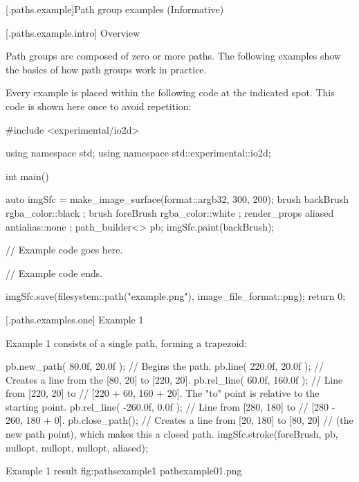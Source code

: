 

 [\iotwod.paths.example]{Path group examples (Informative)}

 [\iotwod.paths.example.intro] {Overview}

\pnum
Path groups are composed of zero or more paths. The following examples show the basics of how path groups work in practice.

\pnum
Every example is placed within the following code at the indicated spot. This code is shown here once to avoid repetition:

\begin{codeblock}
#include <experimental/io2d>

using namespace std;
using namespace std::experimental::io2d;

int main() {
  auto imgSfc = make_image_surface(format::argb32, 300, 200);
  brush backBrush{ rgba_color::black };
  brush foreBrush{ rgba_color::white };
  render_props aliased{ antialias::none };
  path_builder<> pb{};
  imgSfc.paint(backBrush);
  
  // Example code goes here.

  // Example code ends.
  
  imgSfc.save(filesystem::path("example.png"), image_file_format::png);
  return 0;
}
\end{codeblock}

 [\iotwod.paths.examples.one] {Example 1}

\pnum
Example 1 consists of a single path, forming a trapezoid:

\begin{codeblock}
  pb.new_path({ 80.0f, 20.0f }); // Begins the path.
  pb.line({ 220.0f, 20.0f }); // Creates a line from the [80, 20] to [220, 20].
  pb.rel_line({ 60.0f, 160.0f }); // Line from [220, 20] to
    // [220 + 60, 160 + 20]. The "to" point is relative to the starting point.
  pb.rel_line({ -260.0f, 0.0f }); // Line from [280, 180] to 
    // [280 - 260, 180 + 0].
  pb.close_path(); // Creates a line from [20, 180] to [80, 20] 
    // (the new path point), which makes this a closed path.
  imgSfc.stroke(foreBrush, pb, nullopt, nullopt, nullopt, aliased);
\end{codeblock}

\begin{importgraphiciotwod}
{Example 1 result}
{fig:pathsexample1}
{pathexample01.png}
\end{importgraphiciotwod}

